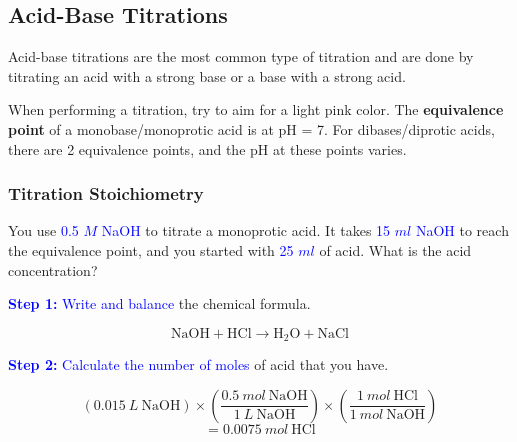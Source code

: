 \documentclass[a4paper, 12pt]{article}
\begin{document}
\subsection{Acid-Base Titrations}
Acid-base titrations are the most common type of titration and are done by titrating an acid with a strong base or a base with a strong acid.

\begin{center}
\end{center}

When performing a titration, try to aim for a light pink color. The \textbf{equivalence point} of a monobase/monoprotic acid is at pH = 7. For dibases/diprotic acids, there are 2 equivalence points, and the pH at these points varies.

\subsubsection{Titration Stoichiometry}
You use \textcolor{blue}{0.5 $M$ NaOH} to titrate a monoprotic acid. It takes \textcolor{blue}{15 $ml$ NaOH} to reach the equivalence point, and you started with \textcolor{blue}{25 $ml$} of acid. What is the acid concentration?

\textcolor{blue}{\textbf{Step 1:} Write and balance} the chemical formula.

$$\text{NaOH} + \text{HCl} \longrightarrow \text{H$_2$O} + \text{NaCl}$$

\textcolor{blue}{\textbf{Step 2:} Calculate the number of moles} of acid that you have.

$$(0.015 \: L \: \text{NaOH}) \times \left(\frac{0.5 \: mol \: \text{NaOH}}{1 \: L \: \text{NaOH}}\right) \times \left(\frac{1 \: mol \: \text{HCl}}{1 \: mol \: \text{NaOH}}\right) $$
$$=0.0075 \: mol \: \text{HCl}$$
\end{document}

